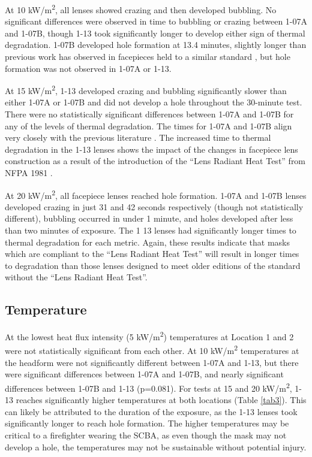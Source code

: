 \documentclass[sn-mathphys]{sn-jnl}%
\theoremstyle{thmstyleone}%
\theoremstyle{thmstyletwo}%
\theoremstyle{thmstylethree}%
\begin{document}
At 10 kW/m\textsuperscript{2}, all lenses showed crazing and then developed bubbling. No significant differences were observed in time to bubbling or crazing between 1-07A and 1-07B, though 1-13 took significantly longer to develop either sign of thermal degradation. 1-07B developed hole formation at 13.4 minutes, slightly longer than previous work has observed in facepieces held to a similar standard \cite{putorti_thermal_2013}, but hole formation was not observed in 1-07A or 1-13.

At 15 kW/m\textsuperscript{2}, 1-13 developed crazing and bubbling significantly slower than either 1-07A or 1-07B and did not develop a hole throughout the 30-minute test. There were no statistically significant differences between 1-07A and 1-07B for any of the levels of thermal degradation. The times for 1-07A and 1-07B align very closely with the previous literature \cite{putorti_thermal_2013}. The increased time to thermal degradation in the 1-13 lenses shows the impact of the changes in facepiece lens construction as a result of the introduction of the “Lens Radiant Heat Test” from NFPA 1981 \cite{national_fire_protection_association_nfpa_2013}.

At 20 kW/m\textsuperscript{2}, all facepiece lenses reached hole formation. 1-07A and 1-07B lenses developed crazing in just 31 and 42 seconds respectively (though not statistically different), bubbling occurred in under 1 minute, and holes developed after less than two minutes of exposure. The 1 13 lenses had significantly longer times to thermal degradation for each metric. Again, these results indicate that masks which are compliant to the “Lens Radiant Heat Test” will result in longer times to degradation than those lenses designed to meet older editions of the standard without the “Lens Radiant Heat Test”.

\subsection{Temperature}\label{subsec8}
At the lowest heat flux intensity (5 kW/m\textsuperscript{2}) temperatures at Location 1 and 2 were not statistically significant from each other.  At 10 kW/m\textsuperscript{2} temperatures at the headform were not significantly different between 1-07A and 1-13, but there were significant differences between 1-07A and 1-07B, and nearly significant differences between 1-07B and 1-13 (p=0.081). For tests at 15 and 20 kW/m\textsuperscript{2}, 1-13 reaches significantly higher temperatures at both locations (Table \ref{tab3}). This can likely be attributed to the duration of the exposure, as the 1-13 lenses took significantly longer to reach hole formation. The higher temperatures may be critical to a firefighter wearing the SCBA, as even though the mask may not develop a hole, the temperatures may not be sustainable without potential injury.
\end{document}
